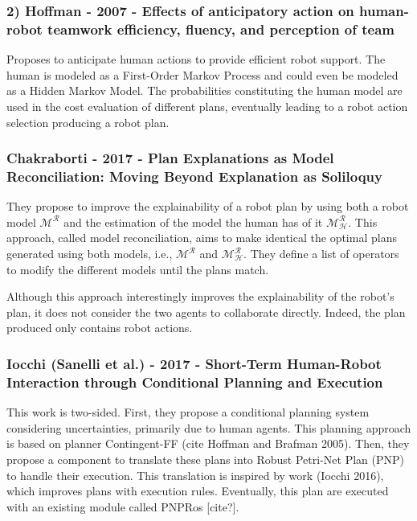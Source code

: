 \subsubsection{2) Hoffman - 2007 - Effects of anticipatory action on human-robot teamwork efficiency, fluency, and perception of team}

Proposes to anticipate human actions to provide efficient robot support. The human is modeled as a First-Order Markov Process and could even be modeled as a Hidden Markov Model. The probabilities constituting the human model are used in the cost evaluation of different plans, eventually leading to a robot action selection producing a robot plan. 

\subsubsection{Chakraborti - 2017 - Plan Explanations as Model Reconciliation: Moving Beyond Explanation as Soliloquy}

They propose to improve the explainability of a robot plan by using both a robot model $\mathcal{M^R}$ and the estimation of the model the human has of it $\mathcal{M^R_H}$. This approach, called model reconciliation, aims to make identical the optimal plans generated using both models, i.e., $\mathcal{M^R}$ and $\mathcal{M^R_H}$. They define a list of operators to modify the different models until the plans match. 

Although this approach interestingly improves the explainability of the robot's plan, it does not consider the two agents to collaborate directly. Indeed, the plan produced only contains robot actions.  

\subsubsection{Iocchi (Sanelli et al.) - 2017 - Short-Term Human-Robot Interaction through Conditional Planning and Execution}

This work is two-sided. First, they propose a conditional planning system considering uncertainties, primarily due to human agents. This planning approach is based on planner Contingent-FF (cite Hoffman and Brafman 2005). Then, they propose a component to translate these plans into Robust Petri-Net Plan (PNP) to handle their execution. This translation is inspired by work (Iocchi 2016), which improves plans with execution rules. Eventually, this plan are executed with an existing module called PNPRos [cite?].

